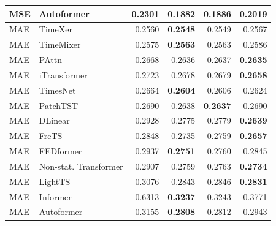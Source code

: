 \begin{longtable}{llrrrr}
MSE & Autoformer & 0.2301 & \textbf{0.1882} & 0.1886 & 0.2019 \\
\midrule
MAE & TimeXer & 0.2560 & \textbf{0.2548} & 0.2549 & 0.2567 \\
MAE & TimeMixer & 0.2575 & \textbf{0.2563} & 0.2563 & 0.2586 \\
MAE & PAttn & 0.2668 & 0.2636 & 0.2637 & \textbf{0.2635} \\
MAE & iTransformer & 0.2723 & 0.2678 & 0.2679 & \textbf{0.2658} \\
MAE & TimesNet & 0.2664 & \textbf{0.2604} & 0.2606 & 0.2624 \\
MAE & PatchTST & 0.2690 & 0.2638 & \textbf{0.2637} & 0.2690 \\
MAE & DLinear & 0.2928 & 0.2775 & 0.2779 & \textbf{0.2639} \\
MAE & FreTS & 0.2848 & 0.2735 & 0.2759 & \textbf{0.2657} \\
MAE & FEDformer & 0.2937 & \textbf{0.2751} & 0.2760 & 0.2845 \\
MAE & Non-stat. Transformer & 0.2907 & 0.2759 & 0.2763 & \textbf{0.2734} \\
MAE & LightTS & 0.3076 & 0.2843 & 0.2846 & \textbf{0.2831} \\
MAE & Informer & 0.6313 & \textbf{0.3237} & 0.3243 & 0.3771 \\
MAE & Autoformer & 0.3155 & \textbf{0.2808} & 0.2812 & 0.2943 \\
\end{longtable}
\endgroup

